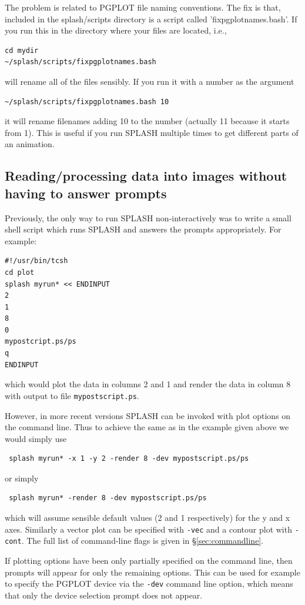 \documentclass[a4paper,10pt]{article}
\newcommand{\splash}{\textsc{SPLASH }}
\begin{document}
 The problem is related to PGPLOT file naming conventions. The fix is that, included in the splash/scripts directory is a script called 'fixpgplotnames.bash'. If you run this in the directory where your files are located, i.e.,
\begin{verbatim}
cd mydir
~/splash/scripts/fixpgplotnames.bash
\end{verbatim}
will rename all of the files sensibly. If you run it with a number as the argument
\begin{verbatim}
~/splash/scripts/fixpgplotnames.bash 10
\end{verbatim}
it will rename filenames adding 10 to the number (actually 11 because it starts from 1). This is
useful if you run \splash multiple times to get different parts of an animation. 

\subsection{Reading/processing data into images without having to answer prompts}
\label{sec:batchmode}
 Previously, the only way to run \splash
non-interactively was to write a small shell script which runs \splash
and answers the prompts appropriately. For example:
\begin{verbatim}
#!/usr/bin/tcsh
cd plot
splash myrun* << ENDINPUT
2
1
8
0
mypostcript.ps/ps
q
ENDINPUT
\end{verbatim}
which would plot the data in columns 2 and 1 and render the data in column 8 with
output to file \verb+mypostscript.ps+.

 However, in more recent versions \splash can be invoked with plot options on the command line.  Thus to achieve the same as in the example given above we would simply use
 \begin{verbatim}
 splash myrun* -x 1 -y 2 -render 8 -dev mypostscript.ps/ps
 \end{verbatim}
 or simply
 \begin{verbatim}
 splash myrun* -render 8 -dev mypostscript.ps/ps
 \end{verbatim}
which will assume sensible default values (2 and 1 respectively) for the y and x axes. Similarly a vector plot can be specified with \verb+-vec+ and a contour plot with \verb+-cont+. The full list of command-line flags is given in \S\ref{sec:commandline}.

 If plotting options have been only partially specified on the command line, then prompts will appear for only the remaining options. This can be used for example to specify the PGPLOT device via the \verb+-dev+ command line option, which means that only the device selection prompt does not appear.
\end{document}

